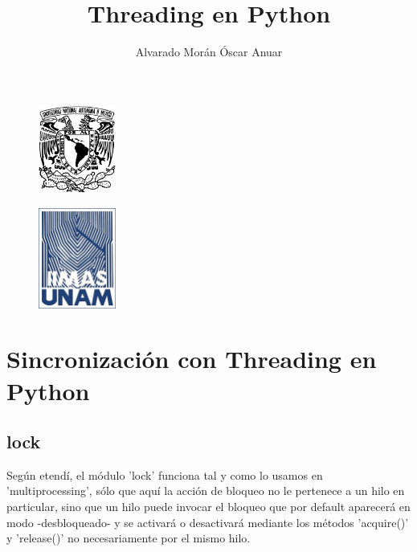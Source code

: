 \documentclass[twocolumn, letterpaper,aps,pra,10pt]{revtex4-1}
\begin{document}
\renewcommand{\figurename}{{\bf Figura }}
\renewcommand{\tablename}{{\bf Tabla}}
\renewcommand{\thesection}{\arabic{section}}
\renewcommand{\thesubsection}{\arabic{subsection}}

\begin{figure}
\flushleft \includegraphics[width=1in]{unam_logo.jpg}
\end{figure}
\begin{figure}
\flushright \includegraphics[width=1in]{iimas.jpg}
\end{figure}

\lhead{}
\rhead{}
\cfoot{\thepage}
\rfoot{}

\vspace*{-1cm}
\title{Threading en Python}
\author{Alvarado Morán Óscar Anuar}

\maketitle
\section*{Sincronización con Threading en Python}

\subsection{lock}
Según etendí, el módulo 'lock' funciona tal y como lo usamos en 'multiprocessing', sólo que aquí la acción de bloqueo no le pertenece a un hilo en particular, sino que un hilo puede invocar el bloqueo que por default aparecerá en modo -desbloqueado- y se activará o desactivará mediante los métodos 'acquire()' y 'release()' no necesariamente por el mismo hilo.
\end{document}
